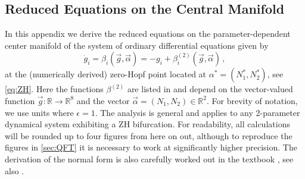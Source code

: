 \begin{subappendices}
\section{Reduced Equations on the Central Manifold}
\label{appendix:normalForm}
In this appendix we derive the reduced equations on the parameter-dependent center manifold of the system of ordinary differential equations given by
\begin{equation} \label{rgflow:eq:ODE}
    \dot g_i = \beta_i(\vec{g}, \vec{\alpha}) = -g_i + \beta^{(2)}_i(\vec g, \vec \alpha)\,,
\end{equation}
at the (numerically derived) zero-Hopf point located at $\alpha^* = (N_1^*, N_2^*)$, see \cref{eq:ZH}. Here the functions $\beta^{(2)}$ are listed in  and depend on the vector-valued function $\vec{g} \colon \mathbb R \rightarrow \mathbb R^8$ and the vector $\vec{\alpha}\textbf{} = (N_1,N_2) \in \mathbb R^2$. For brevity of notation, we use units where $\epsilon=1$. The analysis is general and applies to any 2-parameter dynamical system exhibiting a ZH bifurcation. For readability, all calculations will be rounded up to four figures 
from here on out, although to reproduce the figures in \cref{sec:QFT} it is necessary to work at significantly higher precision. The derivation of the normal form is also carefully worked out in the textbook \cite{Guao2013BifurcationTheory}, see also \cite{Kuznetsov2004}.


\end{subappendices}
